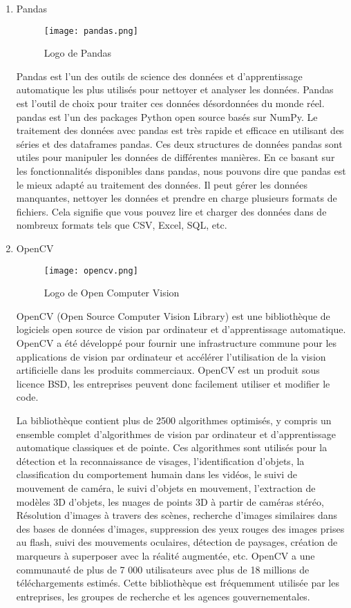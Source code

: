 \begin{enumerate}
        \bfseries
        \item Pandas
        \begin{figure}[H]
            \centering
            \texttt{[image: pandas.png]}
            \caption{Logo de Pandas}\label{fig:pandas}
        \end{figure}
        \normalfont
        Pandas est l'un des outils de science des données et d'apprentissage automatique les plus utilisés pour nettoyer et analyser les données. 
        Pandas est l'outil de choix pour traiter ces données désordonnées du monde réel.  pandas est l'un des packages Python open source basés sur NumPy. 
        Le traitement des données avec pandas est très rapide et efficace en utilisant des séries et des dataframes pandas. Ces deux structures de données pandas sont utiles pour manipuler les données de différentes manières. 
        En ce basant sur les fonctionnalités disponibles dans  pandas, nous pouvons dire que  pandas est le mieux adapté au traitement des données. Il peut gérer les données manquantes, nettoyer les données et prendre en charge plusieurs formats de fichiers. Cela signifie que vous pouvez lire et charger des données dans de nombreux formats tels que CSV, Excel, SQL, etc.


        \bfseries
        \item OpenCV
        \begin{figure}[H]
            \centering
            \texttt{[image: opencv.png]}
            \caption{Logo de Open Computer Vision}\label{fig:opencv}
        \end{figure}
        \normalfont
        OpenCV (Open Source Computer Vision Library) est une bibliothèque de logiciels open source de vision par ordinateur et d'apprentissage automatique. OpenCV a été développé pour fournir une infrastructure commune pour les applications de vision par ordinateur et  accélérer l'utilisation de la vision artificielle dans les produits commerciaux. OpenCV est un produit sous licence BSD, les entreprises peuvent donc facilement utiliser et  modifier  le code.
        
        La bibliothèque contient plus de 2500 algorithmes optimisés, y compris un ensemble complet d'algorithmes de vision par ordinateur et d'apprentissage automatique classiques et  de pointe. Ces algorithmes sont utilisés pour la détection et la reconnaissance de visages, l'identification d'objets, la classification du comportement humain dans les vidéos, le suivi de mouvement de caméra, le suivi d'objets en mouvement, l'extraction de modèles 3D d'objets, les nuages de points 3D à partir de caméras stéréo, Résolution d'images à travers des scènes, recherche d'images similaires dans des bases de données d'images, suppression des yeux rouges des images prises au flash, suivi des mouvements oculaires, détection de paysages, création de marqueurs à superposer avec la réalité augmentée, etc. OpenCV a une communauté de plus de 7 000 utilisateurs avec plus de 18 millions de téléchargements estimés. Cette bibliothèque est fréquemment utilisée par les entreprises, les groupes de recherche et les agences gouvernementales.


\end{enumerate}
